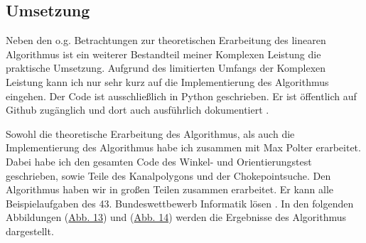 \subsection{Umsetzung}

Neben den o.g. Betrachtungen zur theoretischen Erarbeitung des linearen Algorithmus ist ein weiterer Bestandteil meiner Komplexen Leistung die praktische Umsetzung. Aufgrund des limitierten Umfangs der Komplexen Leistung kann ich nur sehr kurz auf die Implementierung des Algorithmus eingehen.
Der Code ist ausschließlich in Python geschrieben. Er ist öffentlich auf Github zugänglich und dort auch ausführlich dokumentiert \cite{implementierung}. 

Sowohl die theoretische Erarbeitung des Algorithmus, als auch die Implementierung des Algorithmus habe ich zusammen mit Max Polter erarbeitet. Dabei habe ich den gesamten Code des Winkel- und Orientierungstest geschrieben, sowie Teile des Kanalpolygons und der Chokepointsuche. Den Algorithmus haben wir in großen Teilen zusammen erarbeitet. Er kann alle Beispielaufgaben des 43. Bundeswettbewerb Informatik lösen \cite{beispielaufgaben}. In den folgenden Abbildungen (\hyperref[fig:beispiele]{Abb. 13}) und (\hyperref[fig:beispiele2]{Abb. 14}) werden die Ergebnisse des Algorithmus dargestellt.

